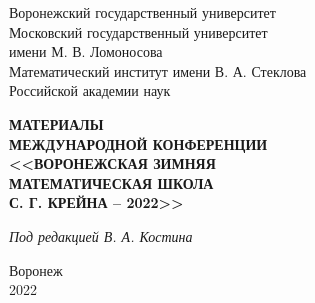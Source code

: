 \begin{titlepage}
   \begin{center}
    Воронежский государственный университет \\
    Московский государственный университет \\
    имени М. В. Ломоносова \\
    Математический институт имени В. А. Стеклова \\
    Российской академии наук
   \end{center}
\vspace{34mm}

    \begin{center}
      {
      \bf

{\bf МАТЕРИАЛЫ \\
МЕЖДУНАРОДНОЙ КОНФЕРЕНЦИИ \\
<<ВОРОНЕЖСКАЯ ЗИМНЯЯ \\
МАТЕМАТИЧЕСКАЯ ШКОЛА \\
С. Г. КРЕЙНА – 2022>> \\}
}
\vspace{5mm}
\textit{Под редакцией В. А. Костина}

\vspace{10mm}


  \end{center}

 \begin{center}
   \vspace{50mm} Воронеж \\ 2022
 \end{center}
\end{titlepage}
